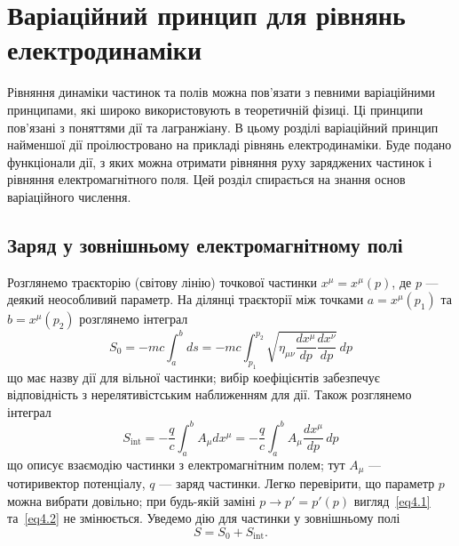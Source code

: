 
\chapter{Варіаційний принцип для рівнянь електродинаміки}\label{\currfilebase}

Рівняння динаміки частинок та полів можна пов'язати з певними варіаційними принципами, які широко використовують в теоретичній фізиці. Ці принципи пов'язані з поняттями дії та лагранжіану. В цьому розділі варіаційний принцип найменшої дії проілюстровано на прикладі рівнянь електродинаміки. Буде подано функціонали дії, з яких можна отримати рівняння руху заряджених частинок і рівняння електромагнітного поля. Цей розділ спирається на знання основ варіаційного числення.

\section{Заряд у зовнішньому електромагнітному полі}

Розглянемо траєкторію (світову лінію) точкової частинки $x^\mu = x^\mu(p)$, де $p$ --- деякий неособливий параметр. На ділянці траєкторії між точками $a = x^\mu(p_1)$ та $b= x^\mu(p_2)$ розглянемо інтеграл
\begin{equation}\label{eq4.1}
S_0 = -mc \int_a^b ds = -mc \int_{p_1}^{p_2} \sqrt{\eta_{\mu\nu} \frac{dx^\mu}{dp} \frac{dx^\nu}{dp}} \, dp
\end{equation}
що має назву дії для вільної частинки; вибір коефіцієнтів забезпечує відповідність з нерелятивістським наближенням для дії. Також розглянемо інтеграл
\begin{equation}\label{eq4.2}
S_{\text{int}} = -\frac{q}{c} \int_a^b A_\mu dx^\mu = -\frac{q}{c} \int_a^b A_\mu \frac{dx^\mu}{dp} \, dp
\end{equation}
що описує взаємодію частинки з електромагнітним полем; тут $A_\mu$ --- чотиривектор потенціалу, $q$ --- заряд частинки. Легко перевірити, що параметр $p$ можна вибрати довільно; при будь-якій заміні $p \to p' = p'(p)$ вигляд~\eqref{eq4.1} та~\eqref{eq4.2} не змінюється. Уведемо дію для частинки у зовнішньому полі
\begin{equation*}
S = S_0 +S_{\text{int}}.
\end{equation*}

